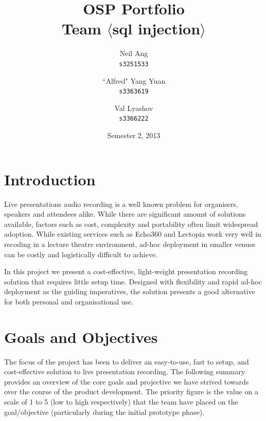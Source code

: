 \documentclass[11pt,a4paper,titlepage]{report}
\title{OSP Portfolio \\ Team $\langle$sql injection$\rangle$}
\author{
  Neil Ang\\
  \texttt{s3251533}
  \and
  ``Alfred" Yang Yuan\\
  \texttt{s3363619}
  \and
  Val Lyashov\\
  \texttt{s3366222}
}
\date{Semester 2, 2013}
\begin{document}
\maketitle

\pagebreak






\tableofcontents
\thispagestyle{empty}
\pagebreak

\section{Introduction}

Live presentations audio recording is a well known problem for organisers, speakers and attendees alike. While there are significant amount of solutions available, factors such as cost, complexity and portability often limit widespread adoption. While existing services such as Echo360 and Lectopia work very well in recoding in a lecture theatre environment, ad-hoc deployment in smaller venues can be costly and logistically difficult to achieve.
 
In this project we present a cost-effective, light-weight presentation recording solution that requires little setup time. Designed with flexibility and rapid ad-hoc deployment as the guiding imperatives, the solution presents a good alternative for both personal and organisational use.


\section{Goals and Objectives}


The focus of the project has been to deliver an easy-to-use, fast to setup, and cost-effective solution to live presentation recording. The following summary provides an overview of the core goals and projective we have strived towards over the course of the product development. The priority figure is the value on a scale of 1 to 5 (low to high respectively) that the team have placed on the goal/objective (particularly during the initial prototype phase).
\end{document}
